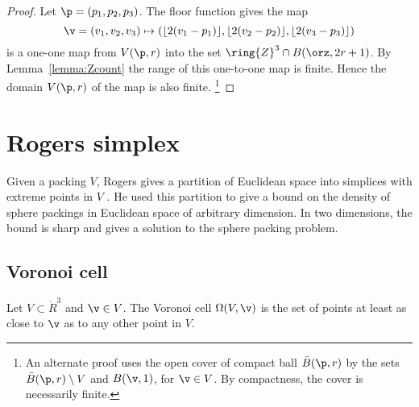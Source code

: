 \begin{proof}  Let $\p = (p_1,p_2,p_3)$. The floor function gives the map
\begin{displaymath}\v=(v_1,v_2,v_3)\mapsto (\lfloor 2(v_1-p_1)
\rfloor, \lfloor 2(v_2-p_2) \rfloor, \lfloor 2(v_3-p_3) \rfloor)\end{displaymath}
is a one-one map from $ V(\p,r)$ into the set $\ring{Z}^3\cap B(\orz,2r + 1)$.  By Lemma~\ref{lemma:Zcount} the range of this one-to-one map is finite. 
Hence the domain $ V(\p,r)$ of the map is also finite.%
\footnote{An alternate proof uses the open cover of compact ball $\bar B(\p,r)$ by the sets $\bar B(\p,r)\setminus V$ and $B(\v,1)$, for $\v\in V$. By compactness, the cover is necessarily finite.}
\end{proof}
%




\section{Rogers simplex}\label{sec:rogers}





Given a packing $ V$, Rogers gives a partition of Euclidean space into
simplices with extreme points in $ V$ \cite{Rogers:1958:Packing}.  He used
this partition to give a bound on the density of sphere packings in
Euclidean space of arbitrary dimension.  In two dimensions, the bound
is sharp and gives a solution to the sphere packing problem.


\subsection{Voronoi cell}

\begin{definition}\label{def:voronoi}
% 
Let $V\subset\ring{R}^3$ and $\v\in V$.
The Voronoi cell 
$\Omega(V,\v)$
is the set of points at least as close to $\v$ as to
any other point in $V$. 
\end{definition}

